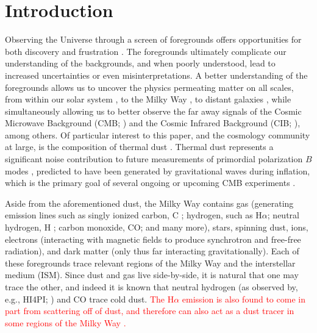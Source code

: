 \documentclass{aa}
\makeatletter
\DeclareRobustCommand{\ion}[2]{%
\relax\ifmmode
\ifx\testbx\f@series
{\mathbf{#1\,\mathsc{#2}}}\else
{\mathrm{#1\,\mathsc{#2}}}\fi
\else\textup{#1\,{\mdseries\textsc{#2}}}%
\fi}
\newcommand{\mathsc}[1]{{\normalfont\textsc{#1}}}
\def\Ha{H$\alpha$}
\def\,{\thinspace}
\newcommand{\edit}[1]{\textcolor{red}{#1}}
\makeatother
\begin{document}

   \maketitle

   
\section{Introduction}
Observing the Universe through a screen of foregrounds offers opportunities for both discovery and frustration \citep[e.g.,][]{BicepDetection,planck2016-l04,planck2016-l11B}. The foregrounds ultimately complicate our understanding of the backgrounds, and when poorly understood, lead to increased uncertainties or even misinterpretations. A better understanding of the foregrounds allows us to uncover the physics permeating matter on all scales, from within our solar system \citep[e.g.,][]{K98}, to the Milky Way \citep[e.g.,][]{planck2014-a12}, to distant galaxies \citep[e.g.,][]{planck2014-XXV,planck2014-XXVI,planck2011-5.2a}, while simultaneously allowing us to better observe the far away signals of the Cosmic Microwave Background (CMB; \citealp{penzias:1965}) and the Cosmic Infrared Background (CIB; \citealp{partridge1967}), among others. Of particular interest to this paper, and the cosmology community at large, is the composition of thermal dust \citep[e.g.,][]{planck2013-p06b,Hensley2023}. Thermal dust represents a significant noise contribution to future measurements of primordial polarization $B$ modes \citep[][]{Bicep2018limit}, predicted to have been generated by gravitational waves during inflation, which is the primary goal of several ongoing or upcoming CMB experiments \citep{litebird2022,SO2019}. 

Aside from the aforementioned dust, the Milky Way contains gas (generating emission lines such as singly ionized carbon, \ion{C}{ii}; hydrogen, such as \Ha; neutral hydrogen, \ion{H}{i}; carbon monoxide, CO; and many more), stars, spinning dust, ions, electrons (interacting with magnetic fields to produce synchrotron and free-free radiation), and dark matter (only thus far interacting gravitationally). Each of these foregrounds trace relevant regions of the Milky Way and the interstellar medium (ISM). Since dust and gas live side-by-side, it is natural that one may trace the other, and indeed it is known that neutral hydrogen (as observed by, e.g., HI4PI; \citealt{HI4PI2016}) and CO \citep{dame2001} trace cold dust. \edit{The H$\alpha$ emission is also found to come in part from scattering off of dust, and therefore can also act as a dust tracer in some regions of the Milky Way \citep{Mattila_2007}.}
\end{document}
